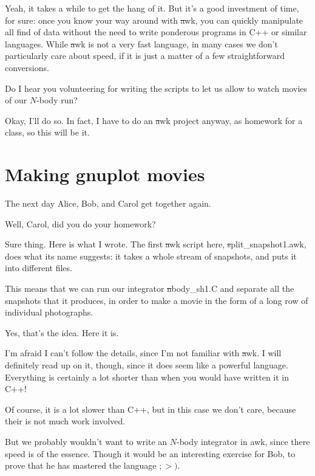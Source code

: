 \carol
Yeah, it takes a while to get the hang of it.  But it's a good
investment of time, for sure: once you know your way around with
{\st awk}, you can quickly manipulate all find of data without the
need to write ponderous programs in C++ or similar languages.
While {\st awk} is not a very fast language, in many cases we don't
particularly care about speed, if it is just a matter of a few
straightforward conversions.

\alice
Do I hear you volunteering for writing the scripts to let us allow to
watch movies of our $N$-body run?

\carol
Okay, I'll do so.  In fact, I have to do an {\st awk} project anyway,
as homework for a class, so this will be it.

\cba

\section{Making gnuplot movies}

The next day Alice, Bob, and Carol get together again.

\abc

\bob
Well, Carol, did you do your homework?

\carol
Sure thing.  Here is what I wrote.  The first {\st awk} script here,
{\st split\_snapshot1.awk}, does what its name suggests: it
takes a whole stream of snapshots, and puts it into different files.

\bob
This means that we can run our integrator {\st nbody\_sh1.C} and
separate all the snapshots that it produces, in order to make a movie
in the form of a long row of individual photographs.

\carol
Yes, that's the idea.  Here it is.

\cba


\abc

\bob
I'm afraid I can't follow the details, since I'm not familiar with
{\st awk}.  I will definitely read up on it, though, since it does
seem like a powerful language.  Everything is certainly a lot shorter
than when you would have written it in C++!

\carol
Of course, it is a lot slower than C++, but in this case we don't
care, because their is not much work involved.

\alice
But we probably wouldn't want to write an $N$-body integrator in awk,
since there speed is of the essence.  Though it would be an
interesting exercise for Bob, to prove that he has mastered the
language $;>)$.


